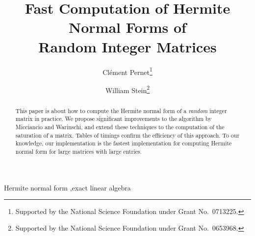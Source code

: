 \documentclass[preprint,12pt]{elsarticle}
\theoremstyle{plain}
\theoremstyle{definition}
\numberwithin{equation}{section}
\numberwithin{figure}{section}
\numberwithin{table}{section}
\begin{document}
\begin{frontmatter}





  \title{Fast Computation of Hermite Normal Forms of\\Random Integer
    Matrices}


\author{Cl\'ement Pernet\footnote{Supported by the National Science Foundation under Grant No.~0713225.}}
\author{William Stein\footnote{Supported by the National Science Foundation under Grant No.~0653968.}}

\begin{abstract}
  This paper is about how to compute the Hermite normal form of a {\em
    random} integer matrix in practice. We propose significant
  improvements to the algorithm by Micciancio and Warinschi, and
  extend these techniques to the computation of the saturation of a
  matrix. Tables of timings confirm the efficiency of this
  approach. To our knowledge, our implementation is  the
  fastest implementation for computing Hermite normal form for large
  matrices with large entries.
\end{abstract}

\begin{keyword}
Hermite normal form \sep exact linear algebra



\end{keyword}

\end{frontmatter}
\end{document}
